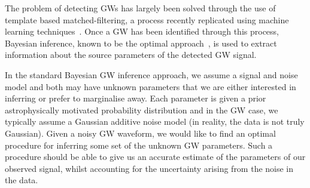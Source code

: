 \documentclass[%
showpacs,
nofootinbib,
 amsmath,amssymb,
 aps,
 twocolumn,
 prl,
 reprint,
floatfix,
]{revtex4-1}
\begin{document}
%
%
%

%
%
The problem of detecting \acp{GW} has largely been solved through the use of
template based matched-filtering, a process recently replicated using machine
learning techniques~\cite{GEORGE201864,PhysRevLett.120.141103,GebKilParHarSch}.
Once a \ac{GW} has been identified through this process, Bayesian inference,
known to be the optimal approach~\cite{2009CQGra..26o5017S}, is used to extract
information about the source parameters of the detected \ac{GW} signal.

%
%
In the standard Bayesian \ac{GW} inference approach, we assume a signal and
noise model and both may have unknown parameters that we are either interested
in inferring or prefer to marginalise away. Each parameter is given a prior
astrophysically motivated probability distribution and in the \ac{GW} case, we
typically assume a Gaussian additive noise model (in reality, the data is not
truly Gaussian). Given a noisy \ac{GW} waveform, we would like to find an
optimal procedure for inferring some set of the unknown \ac{GW} parameters.
Such a procedure should be able to give us an accurate estimate of the
parameters of our observed signal, whilst accounting for the uncertainty
arising from the noise in the data.
\end{document}
